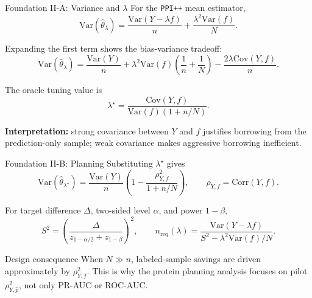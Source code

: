 \documentclass[aspectratio=169,10pt]{beamer}
\newcommand{\PPIPP}{\texttt{PPI++}}
\newcommand{\Var}{\mathrm{Var}}
\newcommand{\Cov}{\mathrm{Cov}}
\newcommand{\Corr}{\mathrm{Corr}}
\begin{document}
\begin{frame}{Foundation II-A: Variance and \(\lambda\)}
For the \PPIPP{} mean estimator,
\[
\Var(\widehat{\theta}_{\lambda})
=
\frac{\Var(Y-\lambda f)}{n}
+
\frac{\lambda^2\Var(f)}{N}.
\]

Expanding the first term shows the bias-variance tradeoff:
\[
\Var(\widehat{\theta}_{\lambda})
=
\frac{\Var(Y)}{n}
+
\lambda^2\Var(f)\left(\frac{1}{n}+\frac{1}{N}\right)
-
\frac{2\lambda\Cov(Y,f)}{n}.
\]

The oracle tuning value is
\[
\lambda^\star
=
\frac{\Cov(Y,f)}
{\Var(f)(1+n/N)}.
\]

\textbf{Interpretation:} strong covariance between \(Y\) and \(f\) justifies borrowing from the prediction-only sample; weak covariance makes aggressive borrowing inefficient.
\end{frame}

\begin{frame}{Foundation II-B: Planning}
Substituting \(\lambda^\star\) gives
\[
\Var(\widehat{\theta}_{\lambda^\star})
=
\frac{\Var(Y)}{n}
\left(1-\frac{\rho^2_{Y,f}}{1+n/N}\right),
\qquad
\rho_{Y,f}=\Corr(Y,f).
\]

For target difference \(\Delta\), two-sided level \(\alpha\), and power \(1-\beta\),
\[
S^2=
\left(\frac{\Delta}{z_{1-\alpha/2}+z_{1-\beta}}\right)^2,
\qquad
n_{\mathrm{req}}(\lambda)
=
\frac{\Var(Y-\lambda f)}
{S^2-\lambda^2\Var(f)/N}.
\]

\begin{block}{Design consequence}
When \(N\gg n\), labeled-sample savings are driven approximately by \(\rho^2_{Y,f}\). This is why the protein planning analysis focuses on pilot \(\rho^2_{Y,\hat p}\), not only PR-AUC or ROC-AUC.
\end{block}
\end{frame}
\end{document}
